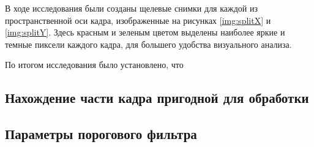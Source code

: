 В ходе исследования были созданы щелевые снимки для каждой из пространственной оси кадра, изображенные на рисунках \ref{img:splitX} и \ref{img:splitY}. Здесь красным и зеленым цветом выделены наиболее яркие и темные пиксели каждого кадра, для большего удобства визуального анализа.

По итогом исследования было установлено, что 
\subsection{Нахождение части кадра пригодной для обработки}
\subsection{Параметры порогового фильтра}